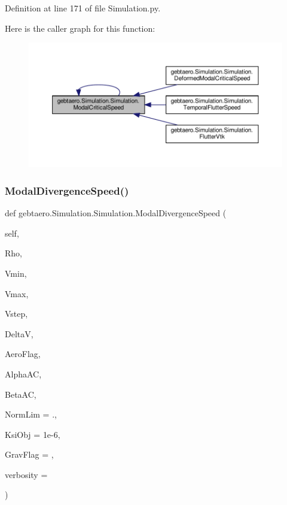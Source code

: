 Definition at line 171 of file Simulation.\+py.

Here is the caller graph for this function\+:
\nopagebreak
\begin{figure}[H]
\begin{center}
\leavevmode
\includegraphics[width=350pt]{classgebtaero_1_1_simulation_1_1_simulation_a9e1695e4fd6c14ac4c9ddcf488ba6b77_icgraph}
\end{center}
\end{figure}
\mbox{\label{classgebtaero_1_1_simulation_1_1_simulation_ac3bea60a9f9d2c552125644a3256df88}} 
\subsubsection{\texorpdfstring{Modal\+Divergence\+Speed()}{ModalDivergenceSpeed()}}
{\footnotesize\ttfamily def gebtaero.\+Simulation.\+Simulation.\+Modal\+Divergence\+Speed (\begin{DoxyParamCaption}\item[{}]{self,  }\item[{}]{Rho,  }\item[{}]{Vmin,  }\item[{}]{Vmax,  }\item[{}]{Vstep,  }\item[{}]{DeltaV,  }\item[{}]{Aero\+Flag,  }\item[{}]{Alpha\+AC,  }\item[{}]{Beta\+AC,  }\item[{}]{Norm\+Lim = {.},  }\item[{}]{Ksi\+Obj = {\ttfamily 1e-\/6},  }\item[{}]{Grav\+Flag = {},  }\item[{}]{verbosity = {} }\end{DoxyParamCaption})}



